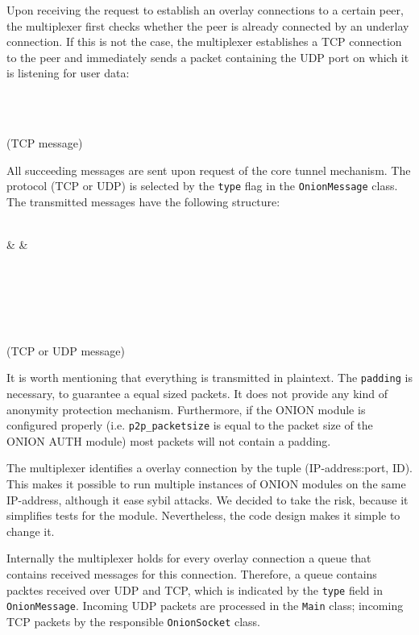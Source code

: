 \documentclass{article}
\begin{document}
Upon receiving the request to establish an overlay connections to a certain peer, the multiplexer
first checks whether the peer is already connected by an underlay connection. If this is not the
case, the multiplexer establishes a TCP connection to the peer and immediately sends a packet
containing the UDP port on which it is listening for user data: \\[8pt]
	\begin{bytefield}[bitwidth=1.0em]{32}
		 \\
	\end{bytefield} \\
(TCP message)

All succeeding messages are sent upon request of the core tunnel mechanism. The protocol (TCP or
UDP) is selected by the \texttt{type} flag in the \texttt{OnionMessage} class. The transmitted
messages have the following structure: \\[8pt]
	\begin{bytefield}[bitwidth=1.0em]{32}
		 \\
		&  
		&  \\
		 \\
		\skippedwords \\
		 \\
		\skippedwords \\
	\end{bytefield} \\
(TCP or UDP message)

It is worth mentioning that everything is transmitted in plaintext. The \texttt{padding} is
necessary, to guarantee a equal sized packets. It does not provide any kind of anonymity protection
mechanism. Furthermore, if the ONION module is configured properly (i.e. \texttt{p2p\_packetsize}
is equal to the packet size of the ONION AUTH module) most packets will not contain a padding.

The multiplexer identifies a overlay connection by the tuple (IP-address:port, ID). This makes it
possible to run multiple instances of ONION modules on the same IP-address, although it ease sybil
attacks. We decided to take the risk, because it simplifies tests for the module. Nevertheless, the
code design makes it simple to change it.

Internally the multiplexer holds for every overlay connection a queue that contains received
messages for this connection. Therefore, a queue contains packtes received over UDP and TCP, which
is indicated by the \texttt{type} field in \texttt{OnionMessage}. Incoming UDP packets are
processed in the \texttt{Main} class; incoming TCP packets by the responsible \texttt{OnionSocket}
class.
\end{document}
